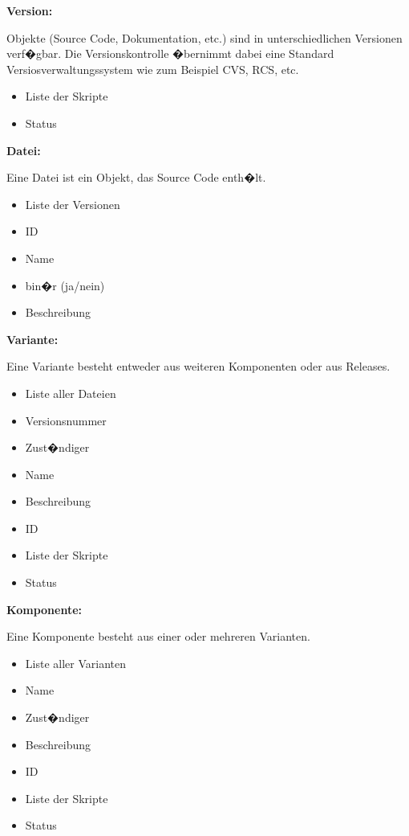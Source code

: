 \textbf{Version:}\par
Objekte (Source Code, Dokumentation, etc.) sind in unterschiedlichen Versionen verf�gbar. Die Versionskontrolle �bernimmt dabei eine Standard Versiosverwaltungssystem wie zum Beispiel CVS, RCS, etc.
\begin{itemize}
\item Liste der Skripte
\item Status\newline
\end{itemize}

\textbf{Datei:}\par
Eine Datei ist ein Objekt, das Source Code enth�lt.
\begin{itemize}
\item Liste der Versionen
\item ID
\item Name
\item bin�r (ja/nein)
\item Beschreibung\newline
\end{itemize}

\textbf{Variante:}\par
Eine Variante besteht entweder aus weiteren Komponenten oder aus Releases.
\begin{itemize}
\item Liste aller Dateien
\item Versionsnummer
\item Zust�ndiger
\item Name
\item Beschreibung
\item ID
\item Liste der Skripte
\item Status\newline
\end{itemize}

\textbf{Komponente:}\par
Eine Komponente besteht aus einer oder mehreren Varianten.
\begin{itemize}
\item Liste aller Varianten
\item Name
\item Zust�ndiger
\item Beschreibung
\item ID
\item Liste der Skripte
\item Status\newline
\end{itemize}

